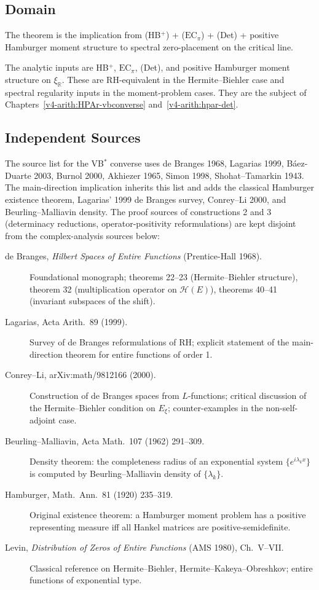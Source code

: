 \subsection{Domain}
\label{v4-arith:w5-j:domain}

The theorem is the implication from
(HB\(^{+}\)) + (\(\mathrm{EC}_\pi\)) + (Det) + positive Hamburger moment
structure to spectral zero-placement on the critical line.

The analytic inputs are HB\(^{+}\), \(\mathrm{EC}_\pi\), (Det), and
positive Hamburger moment structure on \(\xi_{\mathbb R}\).
These are RH-equivalent in the Hermite--Biehler case and spectral
regularity inputs in the moment-problem cases. They are the subject of
Chapters~\ref{v4-arith:HPAr-vbconverse}
and~\ref{v4-arith:hpar-det}.

\subsection{Independent Sources}
\label{v4-arith:w5-j:sources}

The source list for the VB\(^{*}\) converse uses
de Branges 1968, Lagarias 1999, B\'aez-Duarte 2003, Burnol 2000,
Akhiezer 1965, Simon 1998, Shohat--Tamarkin 1943.  The
main-direction implication inherits this list and adds the
classical Hamburger existence theorem, Lagarias' 1999 de Branges
survey, Conrey--Li 2000, and Beurling--Malliavin density. The
proof sources of constructions 2 and 3 (determinacy reductions,
operator-positivity reformulations) are kept disjoint from the
complex-analysis sources below:

\begin{description}
\item[de Branges, \emph{Hilbert Spaces of Entire Functions}
(Prentice-Hall 1968).] Foundational monograph; theorems 22--23
(Hermite--Biehler structure), theorem 32 (multiplication operator
on \(\mathcal{H}(E)\)), theorems 40--41 (invariant subspaces of
the shift).
\item[Lagarias, Acta Arith.~89 (1999).] Survey of de Branges
reformulations of RH; explicit statement of the main-direction
theorem for entire functions of order 1.
\item[Conrey--Li, arXiv:math/9812166 (2000).] Construction of
de Branges spaces from \(L\)-functions; critical discussion of the
Hermite--Biehler condition on \(E_{\xi}\); counter-examples in the
non-self-adjoint case.
\item[Beurling--Malliavin, Acta Math.~107 (1962) 291--309.]
Density theorem: the completeness radius of an exponential system
\(\{e^{i\lambda_{k}x}\}\) is computed by Beurling--Malliavin
density of \(\{\lambda_{k}\}\).
\item[Hamburger, Math.~Ann.~81 (1920) 235--319.] Original
existence theorem: a Hamburger moment problem has a positive
representing measure iff all Hankel matrices are
positive-semidefinite.
\item[Levin, \emph{Distribution of Zeros of Entire Functions}
(AMS 1980), Ch.~V--VII.] Classical reference on Hermite--Biehler,
Hermite--Kakeya--Obreshkov; entire functions of exponential type.
\end{description}

